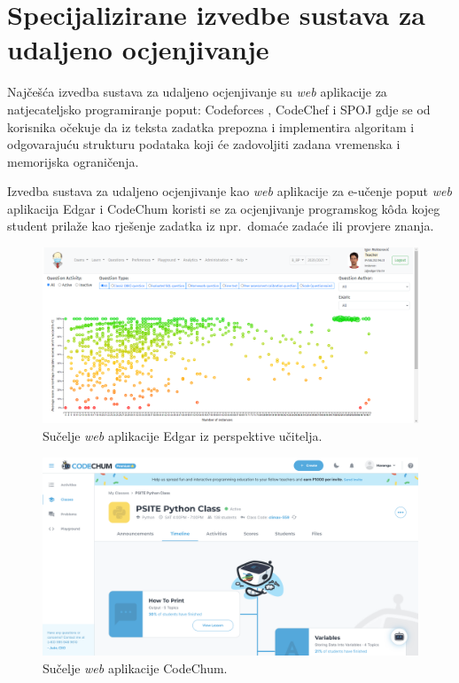 \documentclass[times, utf8, diplomski]{fer}
\begin{document}
\section{Specijalizirane izvedbe sustava za udaljeno ocjenjivanje}
Najčešća izvedba sustava za udaljeno ocjenjivanje su \textit{web} aplikacije za natjecateljsko programiranje poput: Codeforces \citep{Codeforces}, CodeChef \citep{CodeChef} i SPOJ \citep{SPOJ} gdje se od korisnika očekuje da iz teksta zadatka prepozna i implementira algoritam i odgovarajuću strukturu podataka koji će zadovoljiti zadana vremenska i memorijska ograničenja. 

Izvedba sustava za udaljeno ocjenjivanje kao \textit{web} aplikacije za e-učenje poput \textit{web} aplikacija Edgar \citep{mekterovic2020building} i CodeChum \citep{maranga2019codechum} koristi se za ocjenjivanje  programskog kôda kojeg student prilaže kao rješenje zadatka iz npr.\ domaće zadaće ili provjere znanja.

\begin{figure}[htb]
	\centering
	\includegraphics[width=\textwidth]{images/edgar-ui.png}
	\caption{
		Sučelje \textit{web} aplikacije Edgar iz perspektive učitelja.
	}
	\label{fig:edgar-ui}
\end{figure}

\begin{figure}[htb]
	\centering
	\includegraphics[width=\textwidth]{images/codechum-ui.png}
	\caption{
		Sučelje \textit{web} aplikacije CodeChum.
	}
	\label{fig:codechum-ui}
\end{figure}
\end{document}
